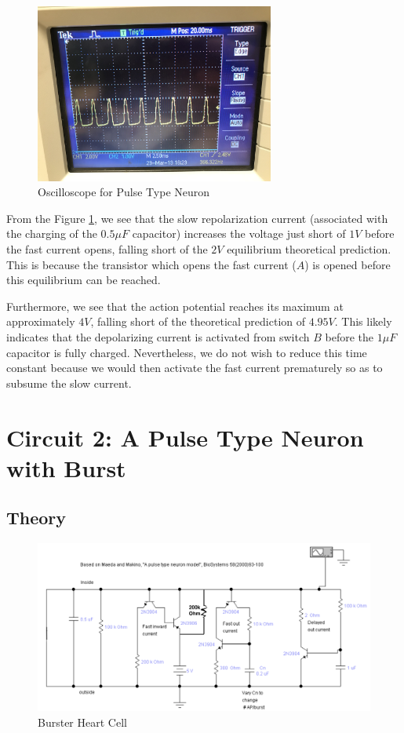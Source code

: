 \documentclass[12]{book}
\newcommand\0{\mathbf{0}}
\newcommand\<{\langle}
\renewcommand\>{\rangle}
\begin{document}
\begin{figure}[h]
\label{fig:pulse}
\centering
\includegraphics[width=0.7\textwidth]{neuron.jpeg}	
\caption{Oscilloscope for Pulse Type Neuron}
\end{figure}

From the Figure \ref{fig:pulse}, we see that the slow repolarization current (associated with the charging of the $0.5 \mu F$ capacitor) increases the voltage just short of $1 V$ before the fast current opens, falling short of the $2V$ equilibrium theoretical prediction. This is because the transistor which opens the fast current ($A$) is opened before this equilibrium can be reached.

Furthermore, we see that the action potential reaches its maximum at approximately $4 V$, falling short of the theoretical prediction of $4.95V$. This likely indicates that the depolarizing current is activated from switch $B$ before the $1 \mu F$ capacitor is fully charged. Nevertheless, we do not wish to reduce this time constant because we would then activate the fast current prematurely so as to subsume the slow current.

\section{Circuit 2: A Pulse Type Neuron with Burst}

\subsection{Theory}

\begin{figure}[h]
\centering
\includegraphics[width=\textwidth]{burster_heart_cell}	
\caption{Burster Heart Cell}
\end{figure}
\end{document}
